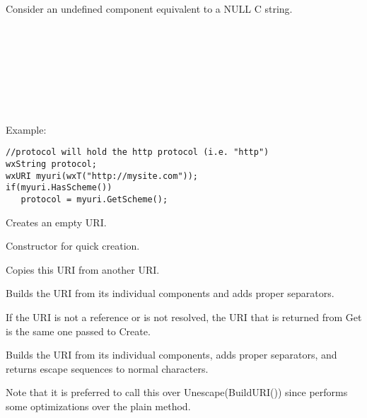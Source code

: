 Consider an undefined component equivalent to a 
NULL C string.\\
\\ 
\\
\\
\\
\\
\\
\\

Example:
\begin{verbatim}
//protocol will hold the http protocol (i.e. "http")
wxString protocol;
wxURI myuri(wxT("http://mysite.com"));
if(myuri.HasScheme())
   protocol = myuri.GetScheme();
\end{verbatim}

\label{wxuriwxuri}


Creates an empty URI.


Constructor for quick creation.



Copies this URI from another URI.



\label{wxuribuilduri}


Builds the URI from its individual components and adds proper separators.

If the URI is not a reference or is not resolved, 
the URI that is returned from Get is the same one 
passed to Create.


\label{wxuribuildunescapeduri}


Builds the URI from its individual components, adds proper separators, and
returns escape sequences to normal characters.

Note that it is preferred to call this over Unescape(BuildURI()) since
 performs some optimizations over the plain method.


